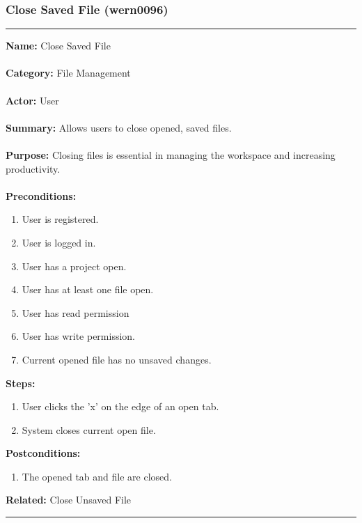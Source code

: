 \documentclass[11pt]{report}
\begin{document}
\subsubsection{Close Saved File (wern0096)}
\vspace{2pt}
\hrule
\vspace{8pt}
	\noindent\textbf{Name:} Close Saved File \\ \\
	\textbf{Category:} File Management \\ \\
	\textbf{Actor:} User \\ \\
	\textbf{Summary:} Allows users to close opened, saved files. \\ \\
	\textbf{Purpose:} Closing files is essential in managing the workspace and increasing productivity. \\ \\
	\textbf{Preconditions:} 
	\begin{enumerate}
		\item User is registered.
		\item User is logged in.
		\item User has a project open.
		\item User has at least one file open.
		\item User has read permission
		\item User has write permission.
		\item Current opened file has no unsaved changes.
	\end{enumerate}		
	\textbf{Steps:}
	\begin{enumerate}
		\item User clicks the 'x' on the edge of an open tab.
		\item System closes current open file.
	\end{enumerate}	
	\textbf{Postconditions:}
	\begin{enumerate}
		\item The opened tab and file are closed.
	\end{enumerate}
	\textbf{Related:} Close Unsaved File
\vspace{8pt}
\hrule
\newpage
\end{document}
